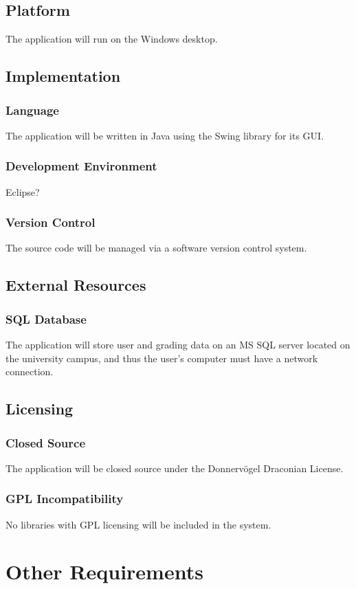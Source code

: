 \documentclass{article}
\begin{document}
\subsection{Platform}
The application will run on the Windows desktop.
\subsection{Implementation}
\subsubsection{Language}
The application will be written in Java using the Swing library for its GUI.
\subsubsection{Development Environment}
Eclipse?
\subsubsection{Version Control}
The source code will be managed via a software version control system.
\subsection{External Resources}
\subsubsection{SQL Database}
The application will store user and grading data on an MS SQL server located on
the university campus, and thus the user's computer must have a network connection.
\subsection{Licensing}
\subsubsection{Closed Source}
The application will be closed source under the Donnervögel Draconian License.
\subsubsection{GPL Incompatibility}
No libraries with GPL licensing will be included in the system.

\section{Other Requirements}
\end{document}
